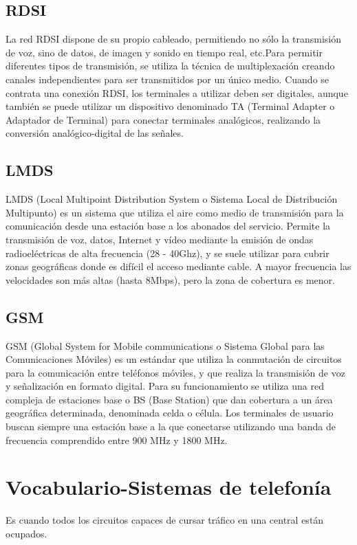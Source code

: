 \documentclass[
	12pt, %
	fleqn, %
	a4paper, %
]{LegrandOrangeBook}
\begin{document}
\subsection{RDSI}
La red RDSI dispone de su propio cableado, permitiendo no sólo la transmisión de voz, sino de datos, de imagen y sonido en tiempo real, etc.Para permitir diferentes tipos de transmisión, se utiliza la técnica de multiplexación creando canales independientes para ser transmitidos por un único medio. Cuando se contrata una conexión RDSI, los terminales a utilizar deben ser digitales, aunque también se puede utilizar un dispositivo denominado TA (Terminal Adapter o Adaptador de Terminal) para conectar terminales analógicos, realizando la conversión analógico-digital de las señales.
\subsection{LMDS}
LMDS (Local Multipoint Distribution System o Sistema Local de Distribución Multipunto) es un sistema que utiliza el aire como medio de transmisión para la comunicación desde una estación base a los abonados del servicio. Permite la transmisión de voz, datos, Internet y vídeo mediante la emisión de ondas radioeléctricas de alta frecuencia (28 - 40Ghz), y se suele utilizar para cubrir zonas geográficas donde es difícil el acceso mediante cable. A mayor frecuencia las velocidades son más altas (hasta 8Mbps), pero la zona de cobertura es menor.
\subsection{GSM}
GSM (Global System for Mobile communications o Sistema Global para las Comunicaciones Móviles) es un estándar que utiliza la conmutación de circuitos para la comunicación entre teléfonos móviles, y que realiza la transmisión de voz y señalización en formato digital. Para su funcionamiento se utiliza una red compleja de estaciones base o BS (Base Station) que dan cobertura a un área geográfica determinada, denominada celda o célula. Los terminales de usuario buscan siempre una estación base a la que conectarse utilizando una banda de frecuencia comprendido entre 900 MHz y 1800 MHz.
\newpage
\section*{Vocabulario-Sistemas de telefonía}
\begin{vocabulary}[Congestión]
Es cuando todos los circuitos capaces de cursar tráfico en una central están ocupados.
\end{vocabulary}
\end{document}
